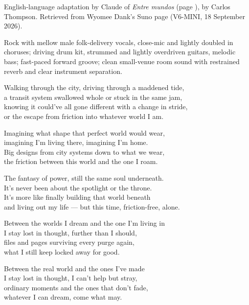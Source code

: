 
\label{sec:between-worlds}
\begin{notes}
English-language adaptation by Claude of \emph{Entre mundos} (page \pageref{sec:entre-mundos}), by Carlos Thompson. Retrieved from Wyomee Dank's Suno page (V6-MINI, 18 September 2026).
\end{notes}
\begin{style}
Rock with mellow male folk-delivery vocals, close-mic and lightly doubled in choruses; driving drum kit, strummed and lightly overdriven guitars, melodic bass; fast-paced forward groove; clean small-venue room sound with restrained reverb and clear instrument separation.
\end{style}
\begin{lyrics}
Walking through the city, driving through a maddened tide,\\
a transit system swallowed whole or stuck in the same jam,\\
knowing it could've all gone different with a change in stride,\\
or the escape from friction into whatever world I am.

Imagining what shape that perfect world would wear,\\
imagining I'm living there, imagining I'm home.\\
Big designs from city systems down to what we wear,\\
the friction between this world and the one I roam.

The fantasy of power, still the same soul underneath.\\
It's never been about the spotlight or the throne.\\
It's more like finally building that world beneath\\
and living out my life — but this time, friction-free, alone.

Between the worlds I dream and the one I'm living in\\
I stay lost in thought, further than I should,\\
files and pages surviving every purge again,\\
what I still keep locked away for good.

Between the real world and the ones I've made\\
I stay lost in thought, I can't help but stray,\\
ordinary moments and the ones that don't fade,\\
whatever I can dream, come what may.


\end{lyrics}
